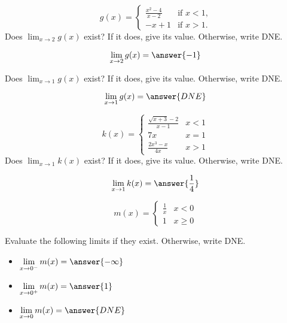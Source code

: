 \documentclass[handout]{ximera}
\begin{document}
\begin{exercise}
\[
g(x) = \begin{cases}
  \frac{x^2 - 4}{x-2}  &\text{if $x<1$,} \\
  -x+1 &\text{if  $x>1$.}
\end{cases}
\]
Does $\lim_{x \to 2} g(x)$ exist?  If it does, give its value.
Otherwise, write DNE.

\[
\lim_{x \to 2} g(x) = \answer{-1}
\]

Does $\lim_{x \to 1} g(x)$ exist?  If it does, give its value.
Otherwise, write DNE.

\[
\lim_{x \to 1} g(x) = \answer{DNE}
\]
\end{exercise}

\begin{exercise}
\[
k(x) = \begin{cases}
  \frac{\sqrt{x+3}-2}{x-1}  & x<1 \\
  7x & x=1 \\
  \frac{2x^3 -x}{4x} & x > 1
\end{cases}
\]
Does $\lim_{x \to 1} k(x)$ exist?  If it does, give its value.
Otherwise, write DNE.

\[
\lim_{x \to 1} k(x) = \answer{\frac{1}{4}}
\]
\end{exercise}

\begin{exercise}
\[
m(x) = \begin{cases}
  \frac{1}{x}  & x < 0 \\
  1 & x \geq 0
\end{cases}
\]

Evaluate the following limits if they exist.  Otherwise, write DNE. 

\begin{itemize}

\item $\displaystyle\lim_{x \to 0^-} m(x) = \answer{-\infty}$

\item $\displaystyle\lim_{x \to 0^+} m(x) = \answer{1}$

\item $\displaystyle\lim_{x \to 0} m(x) = \answer{DNE}$

\end{itemize}

\end{exercise}
\end{document}
